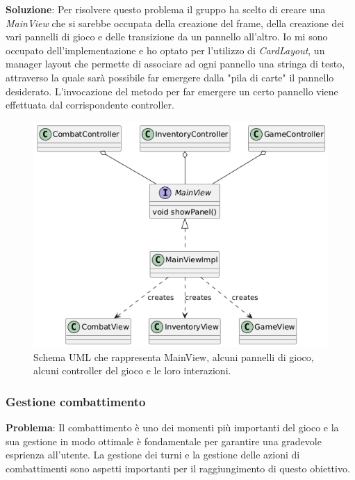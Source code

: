 \documentclass[a4paper,12pt]{report}
\begin{document}
\textbf{Soluzione}: Per risolvere questo problema il gruppo ha scelto di creare una \textit{MainView} che
si sarebbe occupata della creazione del frame, della creazione dei vari pannelli di gioco e
delle transizione da un pannello all'altro.
Io mi sono occupato dell'implementazione e ho optato per l'utilizzo di \textit{CardLayout}, un manager layout
che permette di associare ad ogni pannello una stringa di testo, attraverso la quale sarà possibile far emergere
dalla "pila di carte" il pannello desiderato. L'invocazione del metodo per far emergere un certo pannello viene effettuata
dal corrispondente controller.
\begin{figure}[H]
	\centering{}
	\includegraphics[width=\textwidth]{img/mainView.png}
	\caption{Schema UML che rappresenta MainView, alcuni pannelli di gioco, alcuni controller del gioco e le loro interazioni.}
	\label{img:mainView}
\end{figure}

\subsubsection{Gestione combattimento}

\textbf{Problema}: Il combattimento è uno dei momenti più importanti del gioco e la sua gestione 
in modo ottimale è fondamentale per garantire una gradevole esprienza all'utente. La gestione dei turni e la 
gestione delle azioni di combattimenti sono aspetti importanti per il raggiungimento di questo obiettivo.
\end{document}
